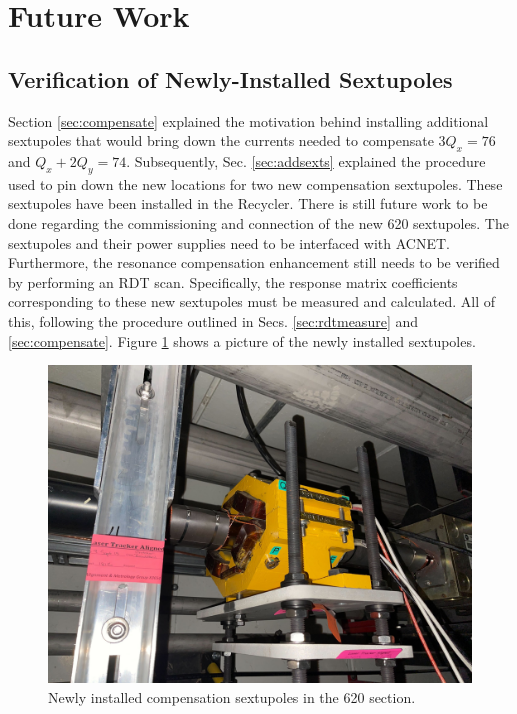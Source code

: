 \section{Future Work}

\subsection{Verification of Newly-Installed Sextupoles}

Section \ref{sec:compensate} explained the motivation behind installing additional sextupoles that would bring down the currents needed to compensate $3Q_x=76$ and $Q_x+ 2Q_y = 74$. Subsequently, Sec. \ref{sec:addsexts} explained the procedure used to pin down the new locations for two new compensation sextupoles. These sextupoles have been installed in the Recycler. There is still future work to be done regarding the commissioning and connection of the new 620 sextupoles. The sextupoles and their power supplies need to be interfaced with ACNET. Furthermore, the resonance compensation enhancement still needs to be verified by performing an RDT scan. Specifically, the response matrix coefficients corresponding to these new sextupoles must be measured and calculated. All of this, following the procedure outlined in Secs. \ref{sec:rdtmeasure} and \ref{sec:compensate}. Figure \ref{fig:new620sexts} shows a picture of the newly installed sextupoles.

\begin{figure}[H]
    \centering
    \includegraphics[width=\columnwidth]{chapter7/620_sext.jpg}
    \caption{Newly installed compensation sextupoles in the 620 section.}
    \label{fig:new620sexts}
   \vspace{-1.25em}
\end{figure}

